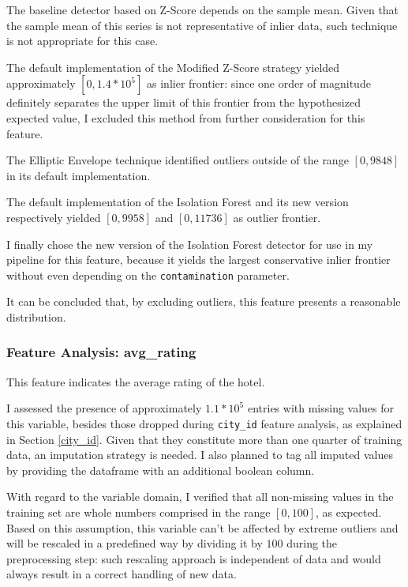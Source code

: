 \documentclass[preprint,12pt,3p]{elsarticle}
\begin{document}
The baseline detector based on Z-Score depends on the sample mean. Given that the sample mean of this series is not representative of inlier data, such technique is not appropriate for this case.

The default implementation of the Modified Z-Score strategy yielded approximately $[0,1.4*10^5]$ as inlier frontier: since one order of magnitude definitely separates the upper limit of this frontier from the hypothesized expected value, I excluded this method from further consideration for this feature.

The Elliptic Envelope technique identified outliers outside of the range $[0,9848]$ in its default implementation.

The default implementation of the Isolation Forest and its new version respectively yielded $[0,9958]$ and $[0,11736]$ as outlier frontier.

I finally chose the new version of the Isolation Forest detector for use in my pipeline for this feature, because it yields the largest conservative inlier frontier without even depending on the \verb|contamination| parameter.

It can be concluded that, by excluding outliers, this feature presents a reasonable distribution.

\subsubsection{Feature Analysis: avg\_rating}
\label{avg_rating}
This feature indicates the average rating of the hotel.

I assessed the presence of approximately $1.1*10^5$ entries with missing values for this variable, besides those dropped during \verb|city_id| feature analysis, as explained in Section \ref{city_id}. Given that they constitute more than one quarter of training data, an imputation strategy is needed. I also planned to tag all imputed values by providing the dataframe with an additional boolean column.

With regard to the variable domain, I verified that all non-missing values in the training set are whole numbers comprised in the range $[0,100]$, as expected. Based on this assumption, this variable can't be affected by extreme outliers and will be rescaled in a predefined way by dividing it by $100$ during the preprocessing step: such rescaling approach is independent of data and would always result in a correct handling of new data.
\end{document}
